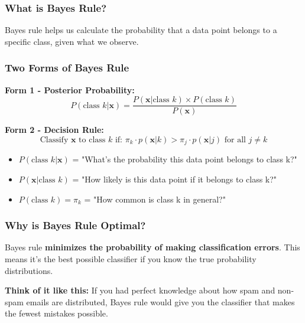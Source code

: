 \documentclass[12pt,a4paper]{article}
\begin{document}
\subsubsection{What is Bayes Rule?}

Bayes rule helps us calculate the probability that a data point belongs to a specific class, given what we observe.

\subsubsection{Two Forms of Bayes Rule}

\textbf{Form 1 - Posterior Probability:}
\begin{equation}
P(\text{class } k | \mathbf{x}) = \frac{P(\mathbf{x} | \text{class } k) \times P(\text{class } k)}{P(\mathbf{x})}
\end{equation}

\textbf{Form 2 - Decision Rule:}
\begin{equation}
\text{Classify } \mathbf{x} \text{ to class } k \text{ if: } \pi_k \cdot p(\mathbf{x}|k) > \pi_j \cdot p(\mathbf{x}|j) \text{ for all } j \neq k
\end{equation}

\begin{tcolorbox}[colback=green!5!white,colframe=green!75!black,title=Simple Explanation]
\begin{itemize}
    \item $P(\text{class } k | \mathbf{x})$ = "What's the probability this data point belongs to class k?"
    \item $P(\mathbf{x} | \text{class } k)$ = "How likely is this data point if it belongs to class k?"
    \item $P(\text{class } k) = \pi_k$ = "How common is class k in general?"
\end{itemize}
\end{tcolorbox}

\subsubsection{Why is Bayes Rule Optimal?}

Bayes rule \textbf{minimizes the probability of making classification errors}. This means it's the best possible classifier if you know the true probability distributions.

\textbf{Think of it like this:} If you had perfect knowledge about how spam and non-spam emails are distributed, Bayes rule would give you the classifier that makes the fewest mistakes possible.
\end{document}

